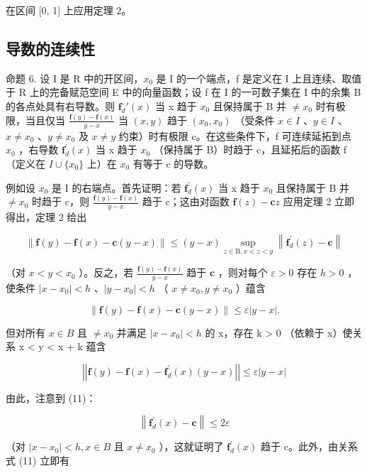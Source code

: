 在区间 {[}0, 1{]} 上应用定理 2。

\subsection{导数的连续性}

命题 6. 设 I 是 R 中的开区间，\(x_0\) 是 I 的一个端点，f 是定义在 I 上且连续、取值于 R 上的完备赋范空间 E 中的向量函数；设 f 在 I 的一可数子集在 I 中的余集 B 的各点处具有右导数。则 \(\mathbf{f}_d'(x)\) 当 x 趋于 \(x_0\) 且保持属于 B 并 \(\neq x_0\) 时有极限，当且仅当 \(\frac{\mathbf{f}(y) - \mathbf{f}(x)}{y - x}\) 当 \((x, y)\) 趋于 \((x_0, x_0)\) （受条件 \(x \in I\) 、\(y \in I\) 、\(x \neq x_0\) 、\(y \neq x_0\) 及 \(x \neq y\) 约束）时有极限 c。在这些条件下，f 可连续延拓到点 \(x_0\) ，右导数 \(\mathbf{f}_{d}^{\prime}(x)\) 当 x 趋于 \(x_{0}\) （保持属于 B）时趋于 c，且延拓后的函数 f （定义在 \(I \cup \{x_{0}\}\) 上）在 \(x_{0}\) 有等于 c 的导数。

例如设 \(x_{0}\) 是 I 的右端点。首先证明：若 \(\mathbf{f}_{d}^{\prime}(x)\) 当 x 趋于 \(x_{0}\) 且保持属于 B 并 \(\neq x_{0}\) 时趋于 c，则 \(\frac{\mathbf{f}(y)-\mathbf{f}(x)}{y-x}\) 趋于 c；这由对函数 \(\mathbf{f}(z)-\mathbf{c}z\) 应用定理 2 立即得出，定理 2 给出

\[
\| \mathbf {f} (y) - \mathbf {f} (x) - \mathbf {c} (y - x) \| \leqslant (y - x) \sup _ {z \in \mathrm{B}, x <   z <   y} \left\| \mathbf {f} _ {d} ^ {\prime} (z) - \mathbf {c} \right\|
\]

（对 \(x < y < x_0\) ）。反之，若 \(\frac{\mathbf{f}(y) - \mathbf{f}(x)}{y - x}\) 趋于 \(\mathbf{c}\) ，则对每个 \(\varepsilon > 0\) 存在 \(h > 0\) ，使条件 \(|x - x_0| < h\) 、\(|y - x_0| < h\) （ \(x \neq x_0, y \neq x_0\) ）蕴含

\[
\left\| \mathbf {f} (y) - \mathbf {f} (x) - \mathbf {c} (y - x) \right\| \leqslant \varepsilon | y - x |.\tag{11}
\]

但对所有 \(x \in B\) 且 \(\neq x_{0}\) 并满足 \(|x - x_{0}| < h\) 的 x，存在 k \textgreater{} 0 （依赖于 x）使关系 x \textless{} y \textless{} x + k 蕴含

\[
\left| \left| \mathbf {f} (y) - \mathbf {f} (x) - \mathbf {f} _ {d} ^ {\prime} (x) (y - x) \right| \right| \leqslant \varepsilon | y - x |\tag{12}
\]

由此，注意到 (11)：

\[
\left\| \mathbf {f} _ {d} ^ {\prime} (x) - \mathbf {c} \right\| \leqslant 2 \varepsilon
\]

（对 \(|x - x_{0}| < h, x \in B\) 且 \(x \neq x_{0}\) ），这就证明了 \(\mathbf{f}_{d}^{\prime}(x)\) 趋于 c。此外，由关系式 (11) 立即有

